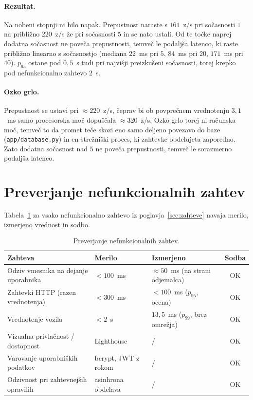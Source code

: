 \paragraph{Rezultat.}
Na nobeni stopnji ni bilo napak. Prepustnost naraste s $161$~z/s pri sočasnosti
$1$ na približno $220$~z/s že pri sočasnosti $5$ in se nato ustali. Od te točke naprej dodatna
sočasnost ne poveča prepustnosti, temveč le podaljša latenco, ki raste približno
linearno s sočasnostjo (mediana $22$~ms pri $5$, $84$~ms pri $20$, $171$~ms pri
$40$). $p_{95}$ ostane pod $0{,}5$~s tudi pri najvišji preizkušeni sočasnosti,
torej krepko pod nefunkcionalno zahtevo $2$~s.

\paragraph{Ozko grlo.}
Prepustnost se ustavi pri $\approx 220$~z/s, čeprav bi ob povprečnem vrednotenju
$3{,}1$~ms samo procesorska moč dopuščala $\approx 320$~z/s. Ozko grlo torej ni
računska moč, temveč to da promet teče skozi eno samo deljeno povezavo do baze
(\texttt{app/database.py}) in en strežniški proces, ki zahtevke obdelujeta
zaporedno. Zato dodatna sočasnost nad $5$ ne poveča prepustnosti, temveč le
sorazmerno podaljša latenco.

\section{Preverjanje nefunkcionalnih zahtev}
\label{sec:nefunkcionalne}

Tabela~\ref{tab:nfr} za vsako nefunkcionalno zahtevo iz
poglavja~\ref{sec:zahteve} navaja merilo, izmerjeno vrednost in sodbo.

\begin{table}[H]
  \centering
  \caption{Preverjanje nefunkcionalnih zahtev.}
  \label{tab:nfr}
  \setlength{\tabcolsep}{4pt}
  \begin{tabularx}{\textwidth}{@{}>{\raggedright\arraybackslash}X
                                 >{\raggedright\arraybackslash}X
                                 >{\raggedright\arraybackslash}X c@{}}
    \toprule
    \textbf{Zahteva} & \textbf{Merilo} & \textbf{Izmerjeno} & \textbf{Sodba} \\
    \midrule
    Odziv vmesnika na dejanje uporabnika & $< 100$~ms & $\approx 50$~ms (na strani odjemalca) & OK \\
    Zahtevki HTTP (razen vrednotenja)    & $< 300$~ms & $< 100$~ms ($p_{95}$, ocena) & OK \\
    Vrednotenje vozila                   & $< 2$~s    & $13{,}5$~ms ($p_{99}$, brez omrežja) & OK \\
    Vizualna privlačnost / dostopnost    & Lighthouse & / & OK \\
    Varovanje uporabniških podatkov      & bcrypt, JWT z rokom & / & OK \\
    Odzivnost pri zahtevnejših opravilih & asinhrona obdelava & / & OK \\
    \bottomrule
  \end{tabularx}
\end{table}


